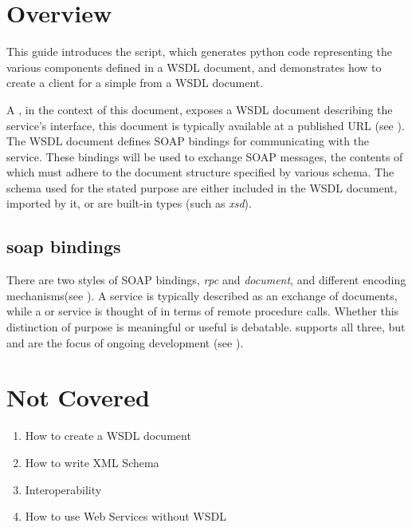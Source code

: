 \section{Overview}
This guide introduces the \WPY script, which generates python code representing
the various components defined in a WSDL document, and demonstrates how to 
create a client for a simple \WS from a WSDL document.

A \WS, in the context of this document, exposes a WSDL document describing the
service's interface, this document is typically available at a published URL (see
\URL).  The WSDL document defines SOAP bindings for communicating with the 
service. These bindings will be used to exchange SOAP messages, the contents of
which must adhere to the document structure specified by various schema. The 
schema used for the stated purpose are either included in the WSDL document, 
imported by it, or are built-in types (such as \emph{xsd}).  

\subsection{soap bindings}
There are two styles of SOAP bindings, \emph{rpc} and \emph{document}, and
different encoding mechanisms(see \WSDL). A \DOCLIT service is typically
described as an exchange of documents, while a \RPCENC or \RPCLIT service is
thought of in terms of remote procedure calls. Whether this distinction of
purpose is meaningful or useful is debatable.  \ZSI supports all three, but 
\RPCLIT and \DOCLIT are the focus of ongoing development (see \WSI).

\section{Not Covered}
\begin{enumerate}
 \item{How to create a WSDL document}
 \item {How to write XML Schema}
 \item {Interoperability}
 \item{How to use Web Services without WSDL}
\end{enumerate}
